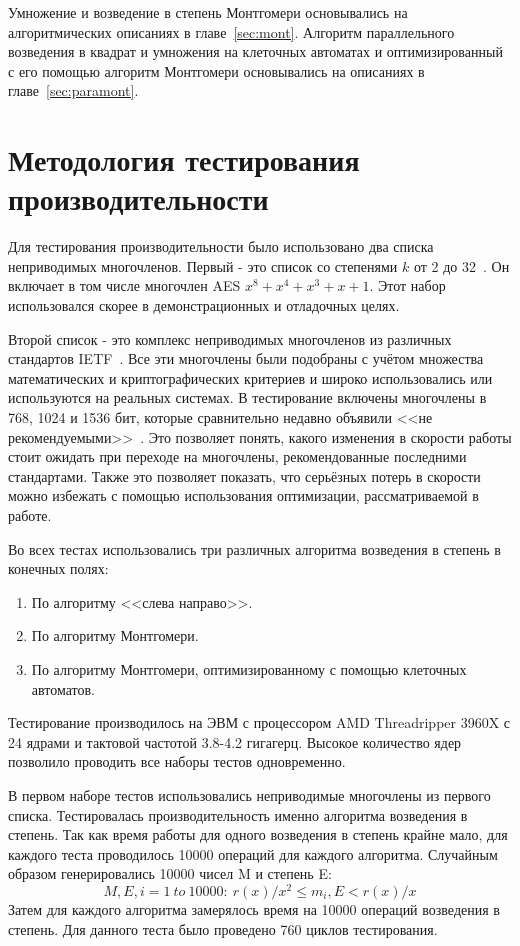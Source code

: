 \documentclass[times,specification,annotation]{itmo-student-thesis}
\begin{document}
Умножение и возведение в степень Монтгомери основывались на алгоритмических описаниях в главе~\ref{sec:mont}.
Алгоритм параллельного возведения в квадрат и умножения на клеточных автоматах и оптимизированный с его помощью алгоритм Монтгомери
основывались на описаниях в главе~\ref{sec:paramont}.

\section{Методология тестирования производительности}\label{sec:meth}

Для тестирования производительности было использовано два списка неприводимых многочленов.
Первый - это список со степенями $k$ от 2 до 32~\cite{par17}.
Он включает в том числе многочлен AES $x^8+x^4+x^3+x+1$.
Этот набор использовался скорее в демонстрационных и отладочных целях.

Второй список - это комплекс неприводимых многочленов из различных стандартов IETF~\cite{rfc2412, rfc3526, rfc7296, rfc7919}.
Все эти многочлены были подобраны с учётом множества математических и криптографических критериев и широко использовались
или используются на реальных системах.
В тестирование включены многочлены в 768, 1024 и 1536 бит, которые сравнительно недавно объявили <<не рекомендуемыми>>~\cite{rfc8247}.
Это позволяет понять, какого изменения в скорости работы стоит ожидать при переходе на многочлены, рекомендованные последними стандартами.
Также это позволяет показать, что серьёзных потерь в скорости можно избежать с помощью использования оптимизации, рассматриваемой в работе.

Во всех тестах использовались три различных алгоритма возведения в степень в конечных полях:
\begin{enumerate}
  \item По алгоритму <<слева направо>>.
  \item По алгоритму Монтгомери.
  \item По алгоритму Монтгомери, оптимизированному с помощью клеточных автоматов.
\end{enumerate}

Тестирование производилось на ЭВМ с процессором AMD Threadripper 3960X с 24 ядрами и тактовой частотой 3.8-4.2 гигагерц.
Высокое количество ядер позволило проводить все наборы тестов одновременно.

В первом наборе тестов использовались неприводимые многочлены из первого списка.
Тестировалась производительность именно алгоритма возведения в степень.
Так как время работы для одного возведения в степень крайне мало, для каждого теста проводилось 10000 операций для
каждого алгоритма.
Случайным образом генерировались 10000 чисел M и степень E:
\[M, E, i = 1~to~10000:~r(x)/x^2 \leq m_i, E < r(x)/x\]
Затем для каждого алгоритма замерялось время на 10000 операций возведения в степень.
Для данного теста было проведено 760 циклов тестирования.
\end{document}
